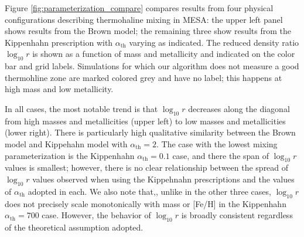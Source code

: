 





Figure \ref{fig:parameterization_compare} compares results from four physical configurations describing thermohaline mixing in MESA: the upper left panel shows results from the Brown model; the remaining three show results from the Kippenhahn prescription with $\alpha_{\text{th}}$ varying as indicated. The reduced density ratio $\log_{10} r$ is shown as a function of mass and metallicity and indicated on the color bar and grid labels.
Simulations for which our algorithm does not measure a good thermohline zone are marked colored grey and have no label; this happens at high mass and low metallicity.
%

In all cases, the most notable trend is that $\log_{10} r$ decreases along the diagonal from high masses and metallicities (upper left) to low masses and metallicities (lower right). 
There is particularly high qualitative similarity between the Brown model and Kippehahn model with $\alpha_{\text{th}} = 2$. 
The case with the lowest mixing parameterization is the Kippenhahn $\alpha_{\text{th}} = 0.1$ case, and there the span of $\log_{10} r$ values is smallest; however, there is no clear relationship between the spread of $\log_{10} r$ values observed when using the Kippehnahn prescriptions and the values of $\alpha_{\text{th}}$ adopted in each. 
We also note that,, unlike in the other three cases, $\log_{10} r$ does not precisely scale monotonically with mass or [Fe/H] in the Kippenhahn $\alpha_{\text{th}} = 700$ case. 
However, the behavior of $\log_{10} r$ is broadly consistent regardless of the theoretical assumption adopted.

